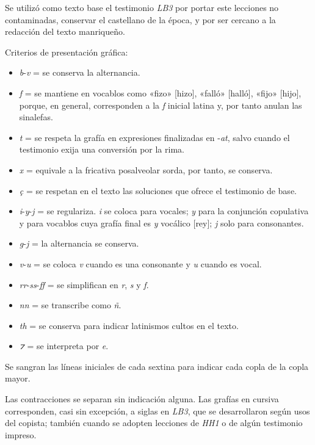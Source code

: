 \documentclass[11pt,a4paper,twoside]{article}
\newcommand{\comillas}[1]{«#1»}
\begin{document}
Se utilizó como texto base el testimonio \textit{LB3} por portar este lecciones no contaminadas, conservar el castellano de la época, y por ser cercano a la redacción del texto manriqueño.\par
%
Criterios de presentación gráfica:
%
\begin{itemize}[label=--]%
\item \textit{b}-\textit{v} = se conserva la alternancia.
\item \textit{f} = se mantiene en vocablos como \comillas{fizo} [hizo], \comillas{falló} [halló], \comillas{fijo} [hijo], porque, en general, corresponden a la \textit{f} inicial latina y, por tanto anulan las sinalefas.
\item \textit{t} = se respeta la grafía en expresiones finalizadas en -\textit{at}, salvo cuando el testimonio exija una conversión por la rima.
\item \textit{x} = equivale a la fricativa posalveolar sorda, por tanto, se conserva.
\item \textit{ç} = se respetan en el texto las soluciones que ofrece el testimonio de base.
\item \textit{i}-\textit{y}-\textit{j} = se regulariza. \textit{i} se coloca para vocales; \textit{y} para la conjunción copulativa y para vocablos cuya grafía final es \textit{y} vocálico [rey]; \textit{j} solo para consonantes.
\item \textit{g}-\textit{j} = la alternancia se conserva.
\item \textit{v}-\textit{u} = se coloca \textit{v} cuando es una consonante y \textit{u} cuando es vocal.
\item \textit{rr}-\textit{ss}-\textit{ff} = se simplifican en \textit{r}, \textit{s} y \textit{f}.
\item \textit{nn} = se transcribe como \textit{ñ}.
\item \textit{th} = se conserva para indicar latinismos cultos en el texto.
\item \textit{⁊} = se interpreta por \textit{e}.%
\end{itemize}\par
%
Se sangran las líneas iniciales de cada sextina para indicar cada copla de la copla mayor.\par
%
Las contracciones se separan sin indicación alguna. Las grafías en cursiva corresponden, casi sin excepción, a siglas en \textit{LB3}, que se desarrollaron según usos del copista; también cuando se adopten lecciones de \textit{HH1} o de algún testimonio impreso.\par
\end{document}

